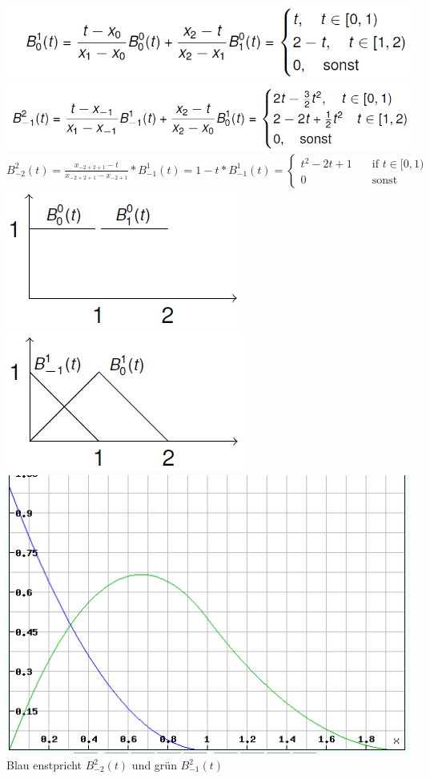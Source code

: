 \\
\hspace{-2.7cm}
\includegraphics[scale=0.5]{1aB10.PNG}
\\
\hspace{-1.4cm}
\includegraphics[scale=0.5]{1aB2-1.PNG}
\\
$B_{-2}^2(t) = \frac{x_{-2+2+1}-t}{x_{-2+2+1}-x_{-2+1}} * B_{-1}^1(t) = 1-t * B_{-1}^1(t) = \begin{cases}
    t^2 - 2t + 1       & \quad \text{if } t \in [0,1)\\
    0  & \quad \text{sonst}
  \end{cases}$
\\
\includegraphics[scale=0.7]{GB0.PNG}
\includegraphics[scale=0.7]{GB1.PNG}
\\
\includegraphics[scale=0.7]{GB2.PNG}
Blau enstpricht $B_{-2}^2(t)$ und grün $B_{-1}^2(t)$



